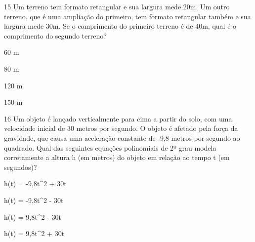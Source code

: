 




\num{15} Um terreno tem formato retangular e sua largura mede 20m. Um outro
terreno, que é uma ampliação do primeiro, tem formato retangular também
e sua largura mede 30m. Se o comprimento do primeiro terreno é de 40m,
qual é o comprimento do segundo terreno?
\item 60 m
\item 80 m
\item 120 m
\item 150 m







\num{16} Um objeto é lançado verticalmente para cima a partir do solo, com
uma velocidade inicial de 30 metros por segundo. O objeto é afetado pela
força da gravidade, que causa uma aceleração constante de -9,8 metros
por segundo ao quadrado. Qual das seguintes equações polinomiais de 2º
grau modela corretamente a altura h (em metros) do objeto em relação ao
tempo t (em segundos)?
\item h(t) = -9,8t^2 + 30t
\item h(t) = -9,8t^2 - 30t
\item h(t) = 9,8t^2 - 30t
\item h(t) = 9,8t^2 + 30t

